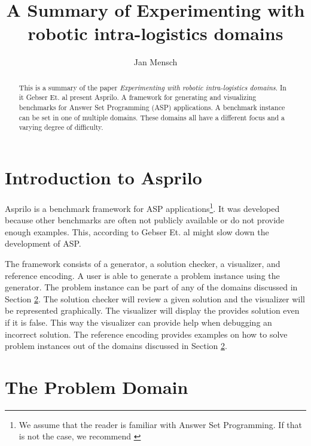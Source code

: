 \documentclass[runningheads]{llncs}
\newcommand{\papertitle}{Experimenting with robotic intra-logistics domains}
\newcommand{\authorquote}{Gebser Et. al}
\begin{document}
\title{A Summary of \papertitle}

\author{Jan Mensch}




%
\maketitle              %
%
\begin{abstract}
This is a summary of the paper \textit{\papertitle}\cite{gebser2018experimenting}. In it \authorquote{}   present Asprilo. A framework for generating and visualizing benchmarks for Answer Set Programming (ASP) applications. A benchmark instance can be set in one of multiple domains. These domains all have a different focus and a varying degree of difficulty. 


\end{abstract}

\section{Introduction to Asprilo}

Asprilo is a benchmark framework for ASP applications\footnote{We assume that the reader is familiar with Answer Set Programming. If that is not the case, we recommend \cite{erdem2016applications}}. It was developed because other benchmarks are often not publicly available or do not provide enough examples. This, according to \authorquote{} might slow down the development of ASP. 

The framework consists of a generator, a solution checker, a visualizer, and reference encoding. A user is able to generate a problem instance using the generator. The problem instance can be part of any of the domains discussed in Section \ref{sec:problem}. The solution checker will review a given solution and the visualizer will be represented graphically. The visualizer will display the provides solution even if it is false. This way the visualizer can provide help when debugging an incorrect solution. The reference encoding provides examples on how to solve problem instances out of the domains discussed in Section \ref{sec:problem}.



\section{The Problem Domain} \label{sec:problem}
\end{document}
